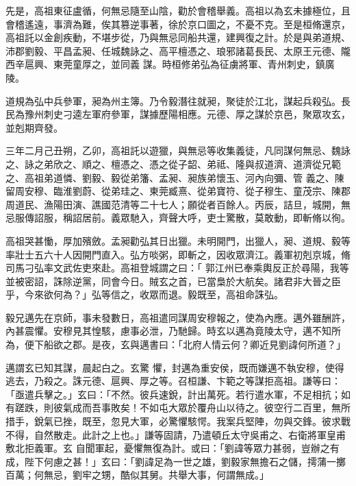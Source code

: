 \begin{pinyinscope}
 先是，高祖東征盧循，何無忌隨至山陰，勸於會稽舉義。高祖以為玄未據極位，且會稽遙遠，事濟為難，俟其篡逆事著，徐於京口圖之，不憂不克。至是桓脩還京，高祖託以金創疾動，不堪步從，乃與無忌同船共還，建興復之計。於是與弟道規、沛郡劉毅、平昌孟昶、任城魏詠之、高平檀憑之、琅邪諸葛長民、太原王元德、隴西辛扈興、東莞童厚之，並同義
 謀。時桓修弟弘為征虜將軍、青州刺史，鎮廣陵。



 道規為弘中兵參軍，昶為州主簿。乃令毅潛往就昶，聚徒於江北，謀起兵殺弘。長民為豫州刺史刁逵左軍府參軍，謀據歷陽相應。元德、厚之謀於京邑，聚眾攻玄，並剋期齊發。



 三年二月己丑朔，乙卯，高祖託以遊獵，與無忌等收集義徒，凡同謀何無忌、魏詠之、詠之弟欣之、順之、檀憑之、憑之從子韶、弟祗、隆與叔道濟、道濟從兄範之、高祖弟道憐、劉毅、毅從弟籓、孟昶、昶族弟懷玉、河內向彌、管
 義之、陳留周安穆、臨淮劉蔚、從弟珪之、東莞臧熹、從弟寶符、從子穆生、童茂宗、陳郡周道民、漁陽田演、譙國范清等二十七人；願從者百餘人。丙辰，詰旦，城開，無忌服傳詔服，稱詔居前。義眾馳入，齊聲大呼，吏士驚散，莫敢動，即斬脩以徇。



 高祖哭甚慟，厚加殯斂。孟昶勸弘其日出獵。未明開門，出獵人，昶、道規、毅等率壯士五六十人因開門直入。弘方啖粥，即斬之，因收眾濟江。義軍初剋京城，脩司馬刁弘率文武佐吏來赴。高祖登城謂之曰：「
 郭江州已奉乘輿反正於尋陽，我等並被密詔，誅除逆黨，同會今日。賊玄之首，已當梟於大航矣。諸君非大晉之臣乎，今來欲何為？」弘等信之，收眾而退。毅既至，高祖命誅弘。



 毅兄邁先在京師，事未發數日，高祖遣同謀周安穆報之，使為內應。邁外雖酬許，內甚震懼。安穆見其惶駭，慮事必泄，乃馳歸。時玄以邁為竟陵太守，邁不知所為，便下船欲之郡。是夜，玄與邁書曰：「北府人情云何？卿近見劉諱何所道？」



 邁謂玄已知其謀，晨起白之。玄驚
 懼，封邁為重安侯，既而嫌邁不執安穆，使得逃去，乃殺之。誅元德、扈興、厚之等。召桓謙、卞範之等謀拒高祖。謙等曰：「亟遣兵擊之。」玄曰：「不然。彼兵速銳，計出萬死。若行遣水軍，不足相抗；如有蹉跌，則彼氣成而吾事敗矣！不如屯大眾於覆舟山以待之。彼空行二百里，無所措手，銳氣已挫，既至，忽見大軍，必驚懼駭愕。我案兵堅陣，勿與交鋒。彼求戰不得，自然散走。此計之上也。」謙等固請，乃遣頓丘太守吳甫之、右衛將軍皇甫敷北拒義軍。玄
 自聞軍起，憂懼無復為計。或曰：「劉諱等眾力甚弱，豈辦之有成，陛下何慮之甚！」玄曰：「劉諱足為一世之雄，劉毅家無擔石之儲，摴蒲一擲百萬；何無忌，劉牢之甥，酷似其舅。共舉大事，何謂無成。」




\end{pinyinscope}
